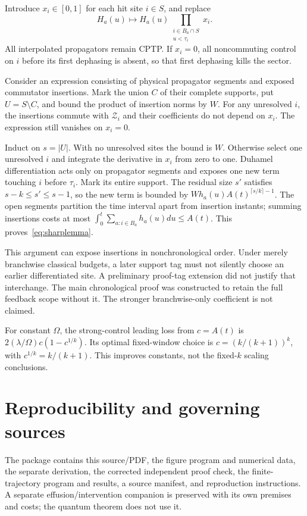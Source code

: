 \documentclass[11pt,a4paper]{article}
\newcommand{\Zcal}{\mathcal Z}
\begin{document}
Introduce $x_i\in[0,1]$ for each hit site $i\in S$, and replace
\begin{equation}
 H_a(u)\longmapsto H_a(u)\prod_{\substack{i\in B_a\cap S\\u<\tau_i}}x_i.
\end{equation}
All interpolated propagators remain CPTP. If $x_i=0$, all noncommuting control on $i$ before its first dephasing is absent, so that first dephasing kills the sector.

Consider an expression consisting of physical propagator segments and exposed commutator insertions. Mark the union $C$ of their complete supports, put $U=S\setminus C$, and bound the product of insertion norms by $W$. For any unresolved $i$, the insertions commute with $\Zcal_i$ and their coefficients do not depend on $x_i$. The expression still vanishes on $x_i=0$.

Induct on $s=|U|$. With no unresolved sites the bound is $W$. Otherwise select one unresolved $i$ and integrate the derivative in $x_i$ from zero to one. Duhamel differentiation acts only on propagator segments and exposes one new term touching $i$ before $\tau_i$. Mark its entire support. The residual size $s'$ satisfies $s-k\le s'\le s-1$, so the new term is bounded by $Wh_a(u)A(t)^{\lceil s/k\rceil-1}$. The open segments partition the time interval apart from insertion instants; summing insertions costs at most $\int_0^t\sum_{a:i\in B_a}h_a(u)du\le A(t)$. This proves~\eqref{eq:sharplemma}.

This argument can expose insertions in nonchronological order. Under merely branchwise classical budgets, a later support tag must not silently choose an earlier differentiated site. A preliminary proof-tag extension did not justify that interchange. The main chronological proof was constructed to retain the full feedback scope without it. The stronger branchwise-only coefficient is not claimed.

For constant $\Omega$, the strong-control leading loss from $c=A(t)$ is $2(\lambda/\Omega)c(1-c^{1/k})$. Its optimal fixed-window choice is $c=(k/(k+1))^k$, with $c^{1/k}=k/(k+1)$. This improves constants, not the fixed-$k$ scaling conclusions.

\section{Reproducibility and governing sources}

The package contains this source/PDF, the figure program and numerical data, the separate derivation, the corrected independent proof check, the finite-trajectory program and results, a source manifest, and reproduction instructions. A separate effusion/intervention companion is preserved with its own premises and costs; the quantum theorem does not use it.
\end{document}
